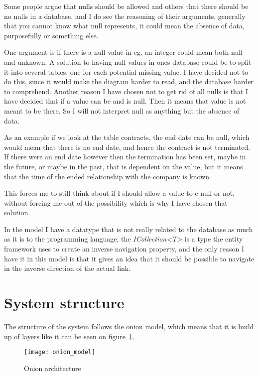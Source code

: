 Some people argue that nulls should be allowed and others that there should be no nulls in a database\cite{stackexchange:db:nullfields}, and I do see the reasoning of their arguments, generally that you cannot know what null represents, it could mean the absence of data, purposefully or something else.

One argument is if there is a null value in eg. an integer could mean both null and unknown. A solution to having null values in ones database could be to split it into several tables, one for each potential missing value. I have decided not to do this, since it would make the diagram harder to read, and the database harder to comprehend. Another reason I have chosen not to get rid of all nulls is that I have decided that if a value can be and is null. Then it means that value is not meant to be there. So I will not interpret null as anything but the absence of data.

As an example if we look at the table contracts, the end date can be null, which would mean that there is no end date, and hence the contract is not terminated. If there were an end date however then the termination has been set, maybe in the future, or maybe in the past, that is dependent on the value, but it means that the time of the ended relationship with the company is known.

This forces me to still think about if I should allow a value to e null or not, without forcing me out of the possibility which is why I have chosen that solution.

In the model I have a datatype that is not really related to the database as much as it is to the programming language, the \textit{ICollection<T>} is a type the entity framework uses to create an inverse navigation property, and the only reason I have it in this model is that it gives an idea that it should be possible to navigate in the inverse direction of the actual link.

\section{System structure}
\label{sec:System structure}
The structure of the system follows the onion model, which means that it is build up of layers like it can be seen on figure~\ref{fig:Onion architecture}.

\begin{figure}[h]
  \centering
  \texttt{[image: onion\_model]}
  \caption{Onion architecture }
  \label{fig:Onion architecture}
\end{figure}

